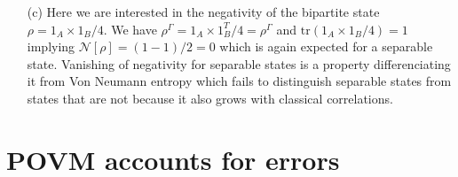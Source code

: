 \documentclass[10pt, a4paper]{article}
\begin{document}
{\begin{enumerate}
\begin{align*}
    \frac{1}{2}
    \begin{pmatrix}
      1 & 0 & 0 & 0\\
      0 & 0 & 1 & 0\\
      0 & 1 & 0 & 0\\
      0 & 0 & 0 & 1
    \end{pmatrix}
    \frac{1}{2}
    \begin{pmatrix}
      1 & 0 & 0 & 0\\
      0 & 0 & 1 & 0\\
      0 & 1 & 0 & 0\\
      0 & 0 & 0 & 1
    \end{pmatrix}
    \right)^{1/2}\right)
    =
    \frac{1}{2}\text{tr}\left(
    \begin{pmatrix}
      1 & 0 & 0 & 0\\
      0 & 1 & 0 & 0\\
      0 & 0 & 1 & 0\\
      0 & 0 & 0 & 1
    \end{pmatrix}^{1/2}\right) = 2
  \end{align*}
  leading to a negativity $\mathcal{N}[\rho] = (2-1)/2 = 1/2$ which is half of the concurrence calculated for the same state in (a) as expected of a two-qubit system. Repeating the calculation for the state $\rho = \ket{00}\bra{00}$, we find $\rho^\Gamma = \rho$ and $\text{tr}(\sqrt{\ket{00}\bra{00} (\ket{00}\bra{00})^{\dagger}}) = 1  + 0 \times 3$ leading to the negativity $\mathcal{N}[\rho] = (1-1)/2 = 0$ as expected for a separable state. 
  \item[(c)] Here we are interested in the negativity of the bipartite state $\rho = 1_A \times 1_B/4$. We have $\rho^\Gamma = 1_A \times 1_B^T/4 = \rho^\Gamma$ and $\text{tr}(1_A \times 1_B/4) = 1$ implying $\mathcal{N}[\rho] = (1-1)/2 = 0$ which is again expected for a separable state. Vanishing of negativity for separable states is a property differenciating it from Von Neumann entropy which fails to distinguish separable states from states that are not because it also grows with classical correlations. 
\end{enumerate}

\section{POVM accounts for errors}

}
\end{document}
